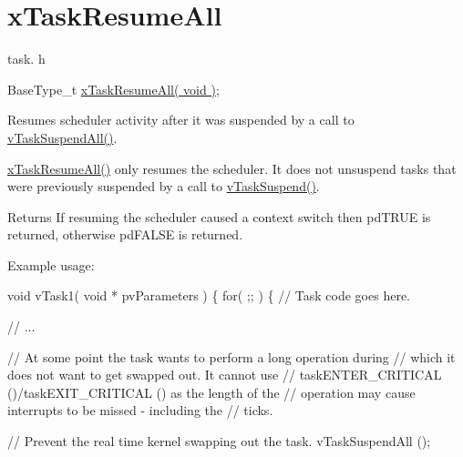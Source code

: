 \hypertarget{group__x_task_resume_all}{}\section{x\+Task\+Resume\+All}
\label{group__x_task_resume_all}
task. h 
\begin{DoxyPre}
BaseType\_t \hyperlink{externals_2freertos_2include_2task_8h_a003f8ae6d649225abd030cc76e1c7d0e}{xTaskResumeAll( void )};
\end{DoxyPre}


Resumes scheduler activity after it was suspended by a call to \hyperlink{externals_2freertos_2include_2task_8h_a366b302eba79d10b5ee2a3756f0fcc43}{v\+Task\+Suspend\+All()}.

\hyperlink{externals_2freertos_2include_2task_8h_a003f8ae6d649225abd030cc76e1c7d0e}{x\+Task\+Resume\+All()} only resumes the scheduler. It does not unsuspend tasks that were previously suspended by a call to \hyperlink{externals_2freertos_2include_2task_8h_a84d4e660b04630be2939d91b3c2412f8}{v\+Task\+Suspend()}.

\begin{DoxyReturn}{Returns}
If resuming the scheduler caused a context switch then pd\+T\+R\+UE is returned, otherwise pd\+F\+A\+L\+SE is returned.
\end{DoxyReturn}
Example usage\+: 
\begin{DoxyPre}
void vTask1( void * pvParameters )
\{
  for( ;; )
  \{
      // Task code goes here.\end{DoxyPre}



\begin{DoxyPre}      // ...\end{DoxyPre}



\begin{DoxyPre}      // At some point the task wants to perform a long operation during
      // which it does not want to get swapped out.  It cannot use
      // taskENTER\_CRITICAL ()/taskEXIT\_CRITICAL () as the length of the
      // operation may cause interrupts to be missed - including the
      // ticks.\end{DoxyPre}



\begin{DoxyPre}      // Prevent the real time kernel swapping out the task.
      vTaskSuspendAll ();\end{DoxyPre}



